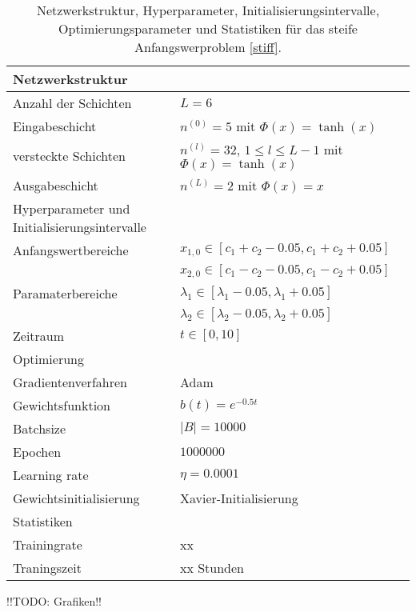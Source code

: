 \begin{table}
       \renewcommand{\arraystretch}{1.0}
       \centering
       \begin{tabular}{ l | l }
              \hline
              Netzwerkstruktur & \\
              \hline
              Anzahl der Schichten & $L=6$ \\
              Eingabeschicht & $n^{(0)}=5$ mit $\Phi(x)=\tanh(x)$ \\
              versteckte Schichten & $n^{(l)}=32$, $1\leq l \leq L-1$ mit $\Phi(x)=\tanh(x)$ \\
              Ausgabeschicht & $n^{(L)}=2$ mit $\Phi(x)=x$ \\
              \hline
              Hyperparameter und Initialisierungsintervalle & \\
              \hline
              Anfangswertbereiche &
              $x_{1,0} \in [c_1+c_2 - 0.05, c_1+c_2 + 0.05]$ \\
              & $x_{2,0} \in [c_1-c_2 - 0.05, c_1-c_2 + 0.05]$ \\
              Paramaterbereiche &
              $\lambda_1 \in [\lambda_1 - 0.05, \lambda_1 + 0.05]$ \\
              & $\lambda_2 \in[\lambda_2 - 0.05, \lambda_2 + 0.05]$ \\
              Zeitraum & $t \in [0, 10]$ \\
              \hline
              Optimierung & \\
              \hline
              Gradientenverfahren & Adam \\
              Gewichtsfunktion & $b(t)=e^{-0.5t}$ \\
              Batchsize & $|B|=10000$ \\
              Epochen & $1000000$ \\
              Learning rate & $\eta= 0.0001$ \\
              Gewichtsinitialisierung & Xavier-Initialisierung \\
              \hline
              Statistiken & \\
              \hline
              Trainingrate & xx \\
              Traningszeit & xx Stunden \\
              \hline
       \end{tabular}
       \caption{Netzwerkstruktur, Hyperparameter, Initialisierungsintervalle, Optimierungsparameter und Statistiken
       für das steife Anfangswerproblem \eqref{stiff}.}
       \label{stiff-table}
\end{table}
!!TODO: Grafiken!!

